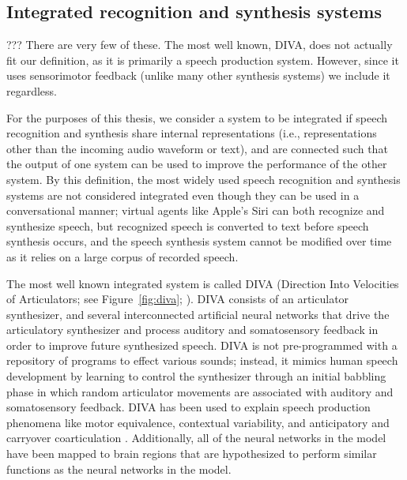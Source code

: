 {\subsection{Integrated recognition and synthesis systems}
\label{sec:bg-diva-kroger}

??? There are very few of these.
The most well known, DIVA,
does not actually fit our definition,
as it is primarily a speech production system.
However, since it uses sensorimotor feedback
(unlike many other synthesis systems)
we include it regardless.

For the purposes of this thesis,
we consider a system to be integrated
if speech recognition and synthesis
share internal representations
(i.e., representations other than
the incoming audio waveform or text),
and are connected such that
the output of one system
can be used to improve
the performance of the other system.
By this definition,
the most widely used
speech recognition and synthesis systems
are not considered integrated
even though they can be used
in a conversational manner;
virtual agents like Apple's Siri
can both recognize and synthesize speech,
but recognized speech is converted
to text before speech synthesis occurs,
and the speech synthesis system
cannot be modified over time
as it relies on a large corpus
of recorded speech.

The most well known integrated system
is called DIVA
(Direction Into Velocities of Articulators;
see Figure~\ref{fig:diva};
\citealp{guenther1995,guenther2004,guenther2006,guenther2006a}).
DIVA consists of an articulator synthesizer,
and several interconnected artificial neural networks
that drive the articulatory synthesizer
and process auditory and somatosensory feedback
in order to improve future synthesized speech.
DIVA is not pre-programmed with a repository
of programs to effect various sounds;
instead, it mimics human speech development
by learning to control the synthesizer
through an initial babbling phase
in which random articulator movements
are associated with auditory
and somatosensory feedback.
DIVA has been used to explain
speech production phenomena
like motor equivalence, contextual variability,
and anticipatory and carryover coarticulation
\citep{guenther1995,guenther2003,nieto2005}.
Additionally, all of the neural networks
in the model have been mapped
to brain regions that are hypothesized
to perform similar functions
as the neural networks in the model.


}
